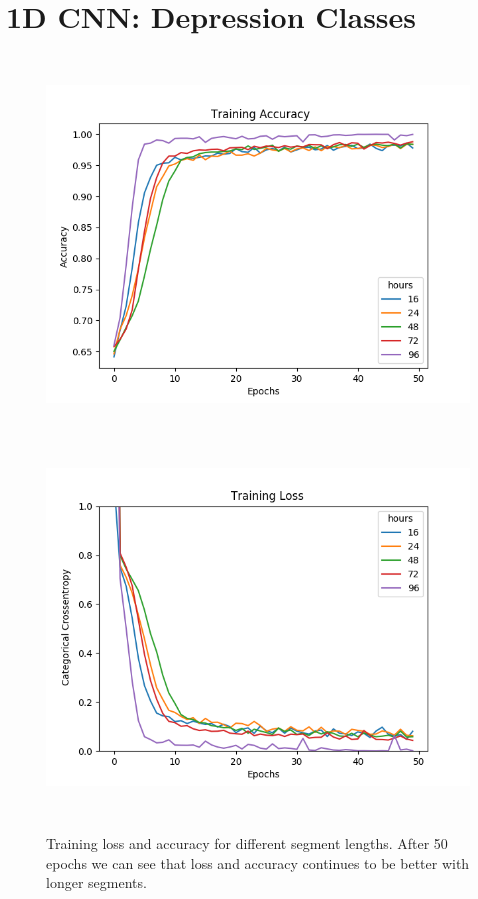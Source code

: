 \section{1D CNN: Depression Classes}

\begin{figure}[!ht]
      \centering
      \includegraphics[height=10cm]{img/depression_class/plot_acc_train.png}
      \includegraphics[height=10cm]{img/depression_class/plot_loss_train.png}

      \caption{Training loss and accuracy for different segment lengths. After 50 epochs we can see that loss and accuracy continues to be better with longer segments.}
      \label{figure:depression_class_50e}
\end{figure}

